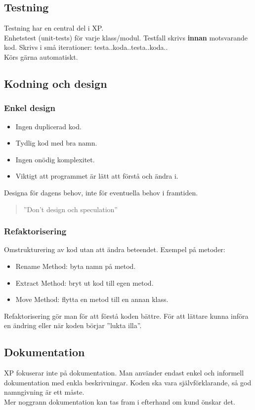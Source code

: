 \documentclass[a4paper]{article}
\begin{document}
\subsection{Testning}
Testning har en central del i XP. \\
Enhetstest (unit-tests) för varje klass/modul. Testfall skrivs \textbf{innan} motsvarande kod. Skrivs i små iterationer: testa..koda..testa..koda.. \\
Körs gärna automatiskt. 
\subsection{Kodning och design}
\subsubsection{Enkel design}
\begin{itemize}
\item{Ingen duplicerad kod.}
\item{Tydlig kod med bra namn.}
\item{Ingen onödig komplexitet.}
\item{Viktigt att programmet är lätt att förstå och ändra i.}
\end{itemize}
Designa för dagens behov, inte för eventuella behov i framtiden. \begin{quote}''Don't design och speculation''\end{quote}

\subsubsection{Refaktorisering}
Omstrukturering av kod utan att ändra beteendet. Exempel på metoder:
\begin{itemize}
\item[]{Rename Method: byta namn på metod.}
\item[]{Extract Method: bryt ut kod till egen metod.}
\item[]{Move Method: flytta en metod till en annan klass.}
\end{itemize}
Refaktorisering gör man för att förstå koden bättre. För att lättare kunna införa en ändring eller när koden börjar ''lukta illa''.
\subsection{Dokumentation}
XP fokuserar inte på dokumentation. Man använder endast enkel och informell dokumentation med enkla beskrivningar. Koden ska vara självförklarande, så god namngivning är ett måste. \\
Mer noggrann dokumentation kan tas fram i efterhand om kund önskar det.
\end{document}

